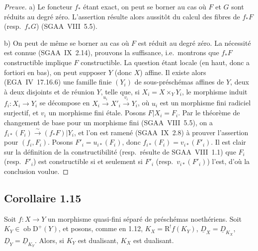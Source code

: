 \documentclass[11pt]{article}
\newcommand{\R}{\mathrm{R}}\newcommand{\RHomCore}{\mathrm{RHom}}
\newcommand{\D}{\mathrm{D}}
\newcommand{\ob}{\operatorname{ob}}
\providecommand{\ob}{\operatorname{ob}}
\providecommand{\R}{\mathrm R}
\begin{document}
\begin{proof}[Preuve]
a) Le foncteur $f_{*}$ étant exact, on peut se borner au cas où $F$ et $G$ sont réduits au degré zéro. L'assertion résulte alors aussitôt du calcul des fibres de $f_{*}F$ (resp.~$f_{*}G$) (SGAA~VIII~5.5).

b) On peut de même se borner au cas où $F$ est réduit au degré zéro. La nécessité est connue (SGAA~IX~2.14), prouvons la suffisance, i.e.~montrons que $f_{*}F$ constructible implique $F$ constructible. La question étant locale (en haut, donc a fortiori en bas), on peut supposer $Y$ (donc $X$) affine. Il existe alors (EGA~IV~17.16.6) une famille finie $(Y_i)$ de sous-préschémas affines de $Y$, deux à deux disjoints et de réunion $Y$, telle que, si $X_i = X \times_Y Y_i$, le morphisme induit $f_i : X_i \to Y_i$ se décompose en $X_i \xrightarrow{u_i} X'_i \xrightarrow{v_i} Y_i$, où $u_i$ est un morphisme fini radiciel surjectif, et $v_i$ un morphisme fini étale. Posons $F|X_i = F_i$. Par le théorème de changement de base pour un morphisme fini (SGAA~VIII~5.5), on a $f_{i*}(F_i) \xrightarrow{\sim} (f_{*}F)|Y_i$, et l'on est ramené (SGAA~IX~2.8) à prouver l'assertion pour $(f_i, F_i)$. Posons $F'_i = u_{i*}(F_i)$, donc $f_{i*}(F_i) = v_{i*}(F'_i)$. Il est clair sur la définition de la constructibilité (resp.~résulte de SGAA~VIII~1.1) que $F_i$ (resp.~$F'_i$) est constructible si et seulement si $F'_i$ (resp.~$v_{i*}(F'_i)$) l'est, d'où la conclusion voulue.
\end{proof}

\subsection*{Corollaire 1.15}
Soit $f : X \to Y$ un morphisme quasi-fini séparé de préschémas noethériens. Soit $K_Y \in \ob \D^{+}(Y)$, et posons, comme en 1.12, $K_X = \R^{!}f(K_Y)$, $\underline{D}_X = \underline{D}_{K_X}$, $\underline{D}_Y = \underline{D}_{K_Y}$. Alors, si $K_Y$ est dualisant, $K_X$ est dualisant.
\end{document}
